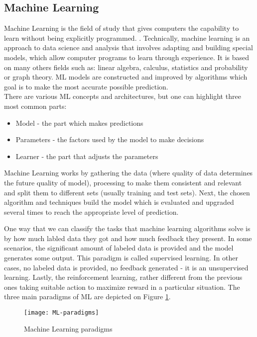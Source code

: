 \documentclass[../Main.tex]{subfiles}
\begin{document}
\subsection{Machine Learning} 
    Machine Learning is the field of study that gives computers the capability to learn without being explicitly programmed. . Technically, machine learning is an approach to data science and analysis that involves adapting and building special models, which allow computer programs to learn through experience. It is based on many others fields such as: linear algebra, calculus, statistics and probability or graph theory. ML models are constructed and improved by algorithms which goal is to make the most accurate possible prediction. \\
    There are various ML concepts and architectures, but one can highlight three most common parts:
    \begin{itemize}
        \item Model - the part which makes predictions
        \item Parameters - the factors used by the model to make decisions
        \item Learner - the part that adjusts the parameters
    \end{itemize}
    Machine Learning works by gathering the data (where quality of data determines the future quality of model), processing to make them consistent and relevant and split them to different sets (usually training and test sets). Next, the chosen algorithm and techniques build the model which is evaluated and upgraded several times to reach the appropriate level of prediction.
    
     One way that we can classify the tasks that machine learning algorithms solve is by how much labled data they got and how much feedback they present. In some scenarios, the significant amount of labeled data is provided and the model generates some output. This paradigm is called supervised learning. In other cases, no labeled data is provided, no feedback generated - it is an unsupervised learning. Lastly, the reinforcement learning, rather different from the previous ones taking suitable action to maximize reward in a particular situation. The three main paradigms of ML are depicted on Figure \ref{fig:ML-paradigms}.
    
    \begin{figure}[h]
        \centering
        \texttt{[image: ML-paradigms]}
        \caption{Machine Learning paradigms}
        \label{fig:ML-paradigms}
    \end{figure}
    
\end{document}
